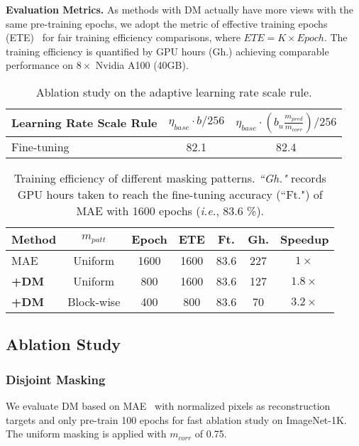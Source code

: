 \documentclass[lettersize,journal]{IEEEtran}
\begin{document}
\textbf{Evaluation Metrics.}
As methods with DM actually have more views with the same pre-training epochs, we adopt the metric of effective training epochs (ETE)~\cite{2021arXiv211107832Z} for fair training efficiency comparisons, where $ETE=K \times Epoch$. The training efficiency is quantified by GPU hours (Gh.) achieving comparable performance on $8\times$ Nvidia A100 (40GB).


\begin{table}[t]
    \centering
    \caption{Ablation study on the adaptive learning rate scale rule.}
    \label{tab:adlrs}
        \begin{tabular}{l c c}
            \toprule
           Learning Rate Scale Rule & $ \eta_{base} \cdot b/256$ & $ \eta_{base} \cdot (b_u \frac{m_{pred}}{m_{corr}})/256$ \\
            \midrule
            Fine-tuning & 82.1 & 82.4 \\
            \bottomrule
        \end{tabular}
\end{table}

\begin{table}[t]
\begin{center}
  \caption{Training efficiency of different masking patterns. \textit{``Gh."} records GPU hours taken to reach the fine-tuning accuracy (``Ft.") of MAE with 1600 epochs (\textit{i.e.}, 83.6 \%).}
  \label{tab:pattern}
    \begin{tabular}{lcccccc}
    \toprule
     Method & $m_{patt}$ & Epoch & ETE & Ft. & Gh. & Speedup \\
      \midrule
     MAE~\cite{2021arXiv211106377H} & Uniform & 1600 & 1600 & 83.6 & 227 & $1\times$ \\
     \quad \textbf{+DM} & Uniform & 800 & 1600 & 83.6 & 127 & $1.8\times$ \\
     \quad \textbf{+DM} & Block-wise & 400 & 800 & 83.6 & 70 & $3.2\times$ \\
      \bottomrule
    \end{tabular}
\end{center}
\end{table}



 \subsection{Ablation Study}
\subsubsection{\textbf{Disjoint Masking}}
We evaluate DM based on MAE~\cite{2021arXiv211106377H} with normalized pixels as reconstruction targets and only pre-train 100 epochs for fast ablation study on ImageNet-1K. The uniform masking is applied with $m_{corr}$ of 0.75. 
\end{document}
